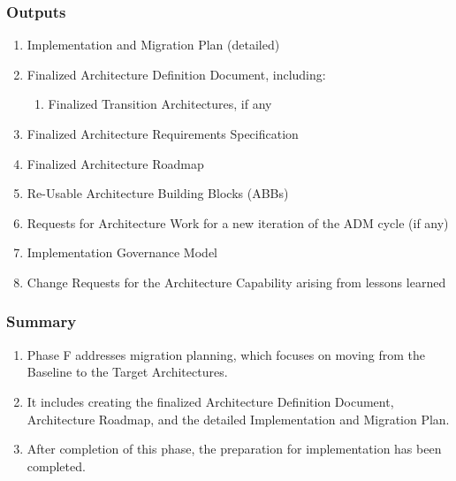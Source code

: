 \documentclass[aspectratio=169, table]{beamer}
\begin{document}
	\begin{frame}
		\frametitle{Outputs}
		\vspace{20pt}
		\begin{enumerate}
			\item Implementation and Migration Plan (detailed)
			\item Finalized Architecture Definition Document, including:
			\begin{enumerate}
				\item Finalized Transition Architectures, if any
			\end{enumerate}
			\item Finalized Architecture Requirements Specification
			\item Finalized Architecture Roadmap
			\item Re-Usable Architecture Building Blocks (ABBs)
			\item Requests for Architecture Work for a new iteration of the ADM cycle (if any)
			\item Implementation Governance Model
			\item Change Requests for the Architecture Capability arising from lessons learned
		\end{enumerate}
	\end{frame}
	
	
	\begin{frame}
		\frametitle{Summary}
		\begin{enumerate}
			\item Phase F addresses migration planning, which focuses on moving from the Baseline to the Target Architectures.
			\item It includes creating the finalized Architecture Definition Document, Architecture Roadmap, and the detailed Implementation and Migration Plan.
			\item After completion of this phase, the preparation for implementation has been completed.
		\end{enumerate}
	\end{frame}
		
\end{document}
